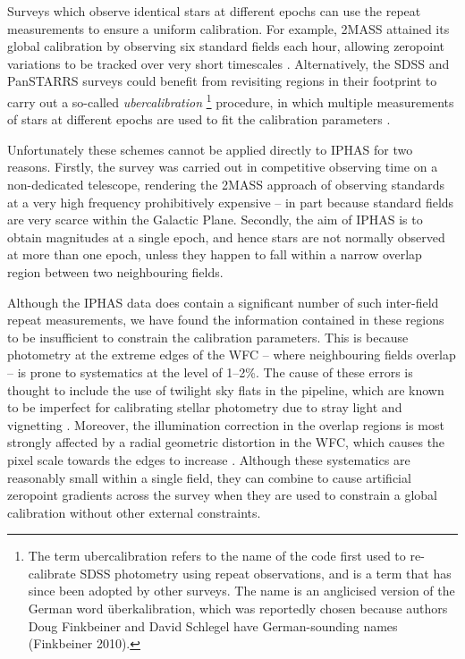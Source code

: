 \documentclass[useAMS,usenatbib]{mn2e}
\begin{document}
Surveys which observe identical stars at different epochs
can use the repeat measurements to ensure a uniform calibration.
For example, 2MASS attained its global calibration
by observing six standard fields each hour, 
allowing zeropoint variations to be tracked 
over very short timescales \citep{Nikolaev2000}.
Alternatively, the SDSS and PanSTARRS surveys could benefit
from revisiting regions in their footprint to 
carry out a so-called \emph{ubercalibration}
\footnote{The term ubercalibration refers to the name of the code
first used to re-calibrate SDSS photometry using repeat observations,
and is a term that has since been adopted by other surveys.
The name is an anglicised version of the German word \"uberkalibration,
which was reportedly chosen because authors Doug Finkbeiner and David Schlegel
have German-sounding names (Finkbeiner 2010).} procedure,
in which multiple measurements of stars at different epochs
are used to fit the calibration parameters
\citep[e.g.][]{Ivezic2007,Padmanabhan2008,Schlafly2012}.

Unfortunately these schemes cannot be applied
directly to IPHAS
for two reasons. 
Firstly, the survey was carried out 
in competitive observing time
on a non-dedicated telescope, 
rendering the 2MASS approach 
of observing standards at a very high frequency
prohibitively expensive
-- in part because standard fields 
are very scarce within the Galactic Plane.
Secondly, the aim of IPHAS is to obtain magnitudes at a single epoch,
and hence stars are not normally observed at more than one epoch,
unless they happen to fall within a narrow overlap region 
between two neighbouring fields.

Although the IPHAS data does contain a significant number of 
such inter-field repeat measurements,
we have found the information contained
in these regions to be insufficient
to constrain the calibration parameters.
This is because photometry at the extreme edges of the WFC
-- where neighbouring fields overlap -- 
is prone to systematics at the level of 1--2\%.
The cause of these errors is thought to include 
the use of twilight sky flats in the pipeline,
which are known to be imperfect for calibrating stellar photometry 
due to stray light and vignetting \citep[e.g.][]{Manfroid1995}.
Moreover, the illumination correction in the overlap regions
is most strongly affected by a radial geometric distortion in the WFC,
which causes the pixel scale towards the edges 
to increase \citep{Gonzalez-Solares2011}.
Although these systematics are reasonably small within a single field,
they can combine to cause artificial zeropoint gradients 
across the survey
when they are used to constrain a global calibration
without other external constraints.
\end{document}
